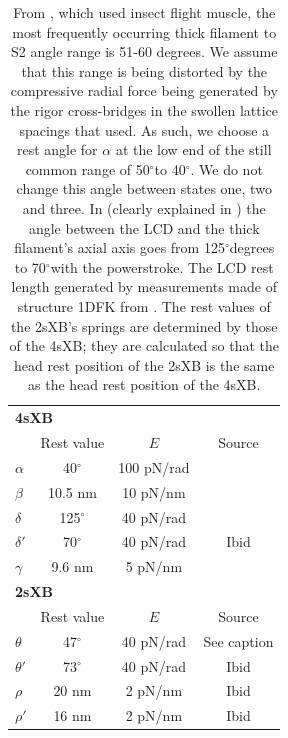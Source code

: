 \documentclass[]{article}
\newcommand{\de}{\ensuremath{^\circ}}
\begin{document}
\begin{table}[h]
    \begin{center}
    \begin{tabular}[t]{|l|ccc|} \hline
    \multicolumn{4}{|l|}{\textbf{4sXB}} \\ \multicolumn{1}{|l}{ } 
              & Rest value & $E$        & Source \\ \cline{2-4}  
    $\alpha$  & 40\de      & 100 pN/rad & \citet{Liu2006}      \\
    $\beta$   & 10.5 nm    & 10 pN/nm   & \citet{Liu2006}      \\
    $\delta$  & 125\de     & 40 pN/rad  & \citet{Taylor1999}   \\
    $\delta'$ & 70\de      & 40 pN/rad  & Ibid                 \\
    $\gamma$  & 9.6 nm     & 5 pN/nm    & \citet{Houdusse2000} \\ \hline
    \multicolumn{4}{|l|}{\textbf{2sXB}} \\ \multicolumn{1}{|l}{ } 
              & Rest value & $E$        & Source      \\ \cline{2-4} 
    $\theta$  & 47\de      & 40 pN/rad  & See caption \\
    $\theta'$ & 73\de      & 40 pN/rad  & Ibid        \\
    $\rho$    & 20 nm      & 2 pN/nm    & Ibid        \\
    $\rho'$   & 16 nm      & 2 pN/nm    & Ibid        \\ \hline
    \end{tabular}
    \end{center}
    \label{parameter_table}
    \caption{ 
    From \citet{Liu2006}, which used insect flight muscle, the most frequently occurring thick filament to S2 angle range is 51-60 degrees. 
    We assume that this range is being distorted by the compressive radial force being generated by the rigor cross-bridges in the swollen lattice spacings that \citet{Liu2006} used. 
    As such, we choose a rest angle for $\alpha$ at the low end of the still common range of 50\de to 40\de. 
    We do not change this angle between states one, two and three.
    In \citet{Taylor1999} (clearly explained in \citet{Davis2009}) the angle between the LCD and the thick filament's axial axis goes from 125\de degrees to 70\de with the powerstroke. 
    The LCD rest length generated by measurements made of structure 1DFK from \citet{Houdusse2000}. 
    The rest values of the 2sXB's springs are determined by those of the 4sXB; they are calculated so that the head rest position of the 2sXB is the same as the head rest position of the 4sXB. 
    }
\end{table}
\end{document}
